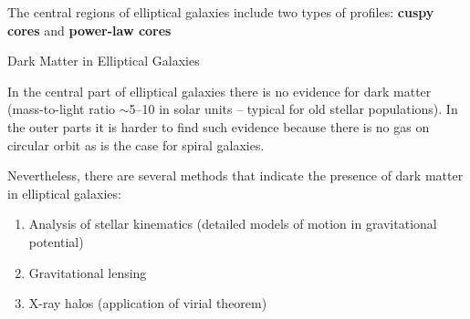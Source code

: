 \documentclass[letterpaper,landscape]{slides}
\begin{document}

\begin{slide}
\begin{center}
\vskip -0.1in
\end{center}


\vfill
\end{slide}





\begin{slide}
The central regions of elliptical galaxies include two types of profiles:
{\bf cuspy cores} and {\bf power-law cores} 


\begin{center}
\vskip -0.1in
\end{center}

\vfill
\end{slide}






\begin{slide}
\begin{center}
{\large \color{red} 
                         Dark Matter in Elliptical Galaxies    }
\end{center}

In the central part of elliptical galaxies there is no evidence for 
dark matter (mass-to-light ratio $\sim$5--10 in solar units -- typical
for old stellar populations). In the outer parts it is harder to 
find such evidence because there is no gas on circular orbit as is
the case for spiral galaxies.

Nevertheless, there are several methods that indicate {\color{blue}  the presence
of dark matter in elliptical galaxies:}
\begin{enumerate}
\item Analysis of stellar kinematics (detailed models of motion in 
    gravitational potential)
\item Gravitational lensing
\item X-ray halos (application of virial theorem)
\end{enumerate}


\vfill
\end{slide}
\end{document}
